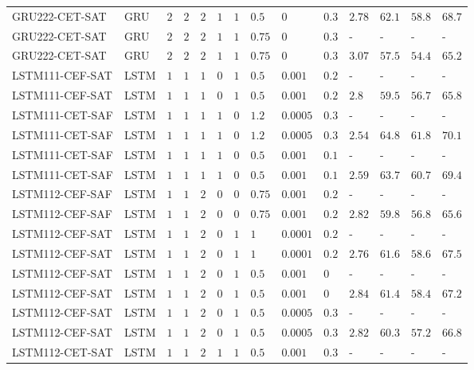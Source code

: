 \begin{table}[tbp]
\begin{tabular}{llllllllllllll}
GRU222-CET-SAT & GRU & $2$ & $2$ & $2$ & $1$ & $1$ & $0.5$ & $0$ & $0.3$ & $2.78$ & $62.1$ & $58.8$ & $68.7$ \\
GRU222-CET-SAT & GRU & $2$ & $2$ & $2$ & $1$ & $1$ & $0.75$ & $0$ & $0.3$ & - & - & - & - \\
GRU222-CET-SAT & GRU & $2$ & $2$ & $2$ & $1$ & $1$ & $0.75$ & $0$ & $0.3$ & $3.07$ & $57.5$ & $54.4$ & $65.2$ \\
LSTM111-CEF-SAT & LSTM & $1$ & $1$ & $1$ & $0$ & $1$ & $0.5$ & $0.001$ & $0.2$ & - & - & - & - \\
LSTM111-CEF-SAT & LSTM & $1$ & $1$ & $1$ & $0$ & $1$ & $0.5$ & $0.001$ & $0.2$ & $2.8$ & $59.5$ & $56.7$ & $65.8$ \\
LSTM111-CET-SAF & LSTM & $1$ & $1$ & $1$ & $1$ & $0$ & $1.2$ & $0.0005$ & $0.3$ & - & - & - & - \\
LSTM111-CET-SAF & LSTM & $1$ & $1$ & $1$ & $1$ & $0$ & $1.2$ & $0.0005$ & $0.3$ & $2.54$ & $64.8$ & $61.8$ & $70.1$ \\
LSTM111-CET-SAF & LSTM & $1$ & $1$ & $1$ & $1$ & $0$ & $0.5$ & $0.001$ & $0.1$ & - & - & - & - \\
LSTM111-CET-SAF & LSTM & $1$ & $1$ & $1$ & $1$ & $0$ & $0.5$ & $0.001$ & $0.1$ & $2.59$ & $63.7$ & $60.7$ & $69.4$ \\
LSTM112-CEF-SAF & LSTM & $1$ & $1$ & $2$ & $0$ & $0$ & $0.75$ & $0.001$ & $0.2$ & - & - & - & - \\
LSTM112-CEF-SAF & LSTM & $1$ & $1$ & $2$ & $0$ & $0$ & $0.75$ & $0.001$ & $0.2$ & $2.82$ & $59.8$ & $56.8$ & $65.6$ \\
LSTM112-CEF-SAT & LSTM & $1$ & $1$ & $2$ & $0$ & $1$ & $1$ & $0.0001$ & $0.2$ & - & - & - & - \\
LSTM112-CEF-SAT & LSTM & $1$ & $1$ & $2$ & $0$ & $1$ & $1$ & $0.0001$ & $0.2$ & $2.76$ & $61.6$ & $58.6$ & $67.5$ \\
LSTM112-CEF-SAT & LSTM & $1$ & $1$ & $2$ & $0$ & $1$ & $0.5$ & $0.001$ & $0$ & - & - & - & - \\
LSTM112-CEF-SAT & LSTM & $1$ & $1$ & $2$ & $0$ & $1$ & $0.5$ & $0.001$ & $0$ & $2.84$ & $61.4$ & $58.4$ & $67.2$ \\
LSTM112-CEF-SAT & LSTM & $1$ & $1$ & $2$ & $0$ & $1$ & $0.5$ & $0.0005$ & $0.3$ & - & - & - & - \\
LSTM112-CEF-SAT & LSTM & $1$ & $1$ & $2$ & $0$ & $1$ & $0.5$ & $0.0005$ & $0.3$ & $2.82$ & $60.3$ & $57.2$ & $66.8$ \\
LSTM112-CET-SAT & LSTM & $1$ & $1$ & $2$ & $1$ & $1$ & $0.5$ & $0.001$ & $0.3$ & - & - & - & - \\

\end{tabular}
\end{table}
